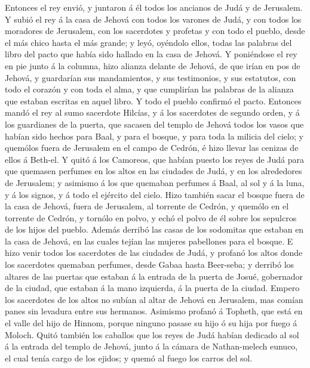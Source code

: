  Entonces el rey envió, y juntaron á él todos los ancianos
de Judá y de Jerusalem.  Y subió el rey á la casa de Jehová
con todos los varones de Judá, y con todos los moradores de Jerusalem,
con los sacerdotes y profetas y con todo el pueblo, desde el más chico
hasta el más grande; y leyó, oyéndolo ellos, todas las palabras del
libro del pacto que había sido hallado en la casa de Jehová.
 Y poniéndose el rey en pie junto á la columna, hizo alianza
delante de Jehová, de que irían en pos de Jehová, y guardarían sus
mandamientos, y sus testimonios, y sus estatutos, con todo el corazón y
con toda el alma, y que cumplirían las palabras de la alianza que
estaban escritas en aquel libro. Y todo el pueblo confirmó el pacto.
 Entonces mandó el rey al sumo sacerdote Hilcías, y á los
sacerdotes de segundo orden, y á los guardianes de la puerta, que
sacasen del templo de Jehová todos los vasos que habían sido hechos para
Baal, y para el bosque, y para toda la milicia del cielo; y quemólos
fuera de Jerusalem en el campo de Cedrón, é hizo llevar las cenizas de
ellos á Beth-el.  Y quitó á los Camoreos, que habían puesto
los reyes de Judá para que quemasen perfumes en los altos en las
ciudades de Judá, y en los alrededores de Jerusalem; y asimismo á los
que quemaban perfumes á Baal, al sol y á la luna, y á los signos, y á
todo el ejército del cielo.  Hizo también sacar el bosque
fuera de la casa de Jehová, fuera de Jerusalem, al torrente de Cedrón, y
quemólo en el torrente de Cedrón, y tornólo en polvo, y echó el polvo de
él sobre los sepulcros de los hijos del pueblo.  Además
derribó las casas de los sodomitas que estaban en la casa de Jehová, en
las cuales tejían las mujeres pabellones para el bosque.  E
hizo venir todos los sacerdotes de las ciudades de Judá, y profanó los
altos donde los sacerdotes quemaban perfumes, desde Gabaa hasta
Beer-seba; y derribó los altares de las puertas que estaban á la entrada
de la puerta de Josué, gobernador de la ciudad, que estaban á la mano
izquierda, á la puerta de la ciudad.  Empero los sacerdotes
de los altos no subían al altar de Jehová en Jerusalem, mas comían panes
sin levadura entre sus hermanos.  Asimismo profanó á
Topheth, que está en el valle del hijo de Hinnom, porque ninguno pasase
su hijo ó su hija por fuego á Moloch.  Quitó también los
caballos que los reyes de Judá habían dedicado al sol á la entrada del
templo de Jehová, junto á la cámara de Nathan-melech eunuco, el cual
tenía cargo de los ejidos; y quemó al fuego los carros del sol.
